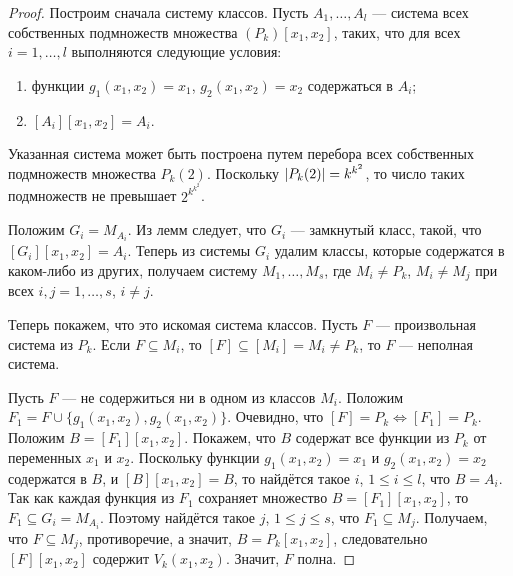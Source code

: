 \begin{proof}
    Построим сначала систему классов. Пусть $A_1, \ldots, A_l$ --- система всех собственных подмножеств множества $(P_k)[x_1, x_2]$, таких, что для всех $i = 1, \ldots, l$ выполняются следующие условия:
    \begin{enumerate}[nolistsep]
        \item функции $g_1(x_1, x_2) = x_1$, $g_2(x_1, x_2) = x_2$ содержаться в $A_i$;
        \item $[A_i][x_1, x_2] = A_i$.
    \end{enumerate}
    Указанная система может быть построена путем перебора всех собственных подмножеств множества $P_k(2)$. Поскольку $\left\lvert P_k(2)\right\rvert = k^{k^2}$, то число таких подмножеств не превышает $2^{k^{k^2}}$.

    Положим $G_i = M_{A_i}$. Из лемм следует, что $G_i$ --- замкнутый класс, такой, что $[G_i][x_1, x_2] = A_i$. Теперь из системы $G_i$ удалим классы, которые содержатся в каком-либо из других, получаем систему $M_1, \ldots, M_s$, где $M_i \neq P_k$, $M_i \neq M_j$ при всех $i,j = 1, \ldots, s$, $i\neq j$.

    Теперь покажем, что это искомая система классов. Пусть $F$ --- произвольная система из $P_k$. Если $F\subseteq M_i$, то $[F] \subseteq [M_i] = M_i \neq P_k$, то $F$ --- неполная система.

    Пусть $F$ --- не содержиться ни в одном из классов $M_i$. Положим
    $F_1 = F \cup \{g_1(x_1, x_2), g_2(x_1, x_2)\}$. Очевидно, что $[F] = P_k \Leftrightarrow [F_1] = P_k$. Положим $B=[F_1][x_1, x_2]$. Покажем, что $B$ содержат все функции из $P_k$ от переменных $x_1$ и $x_2$. Поскольку функции $g_1(x_1, x_2) = x_1$ и $g_2(x_1, x_2) = x_2$ содержатся в $B$, и $[B][x_1, x_2] = B$, то найдётся такое $i$, $1 \leqslant i \leqslant l$, что $B = A_i$. Так как каждая функция из $F_1$ сохраняет множество $B = [F_1][x_1, x_2]$, то $F_1 \subseteq G_i = M_{A_i}$. Поэтому найдётся такое $j$, $1 \leqslant j \leqslant s$, что $F_1 \subseteq M_j$. Получаем, что $F\subseteq M_j$, противоречие, а значит, $B = P_k[x_1, x_2]$, следовательно $[F][x_1, x_2]$ содержит $V_k(x_1, x_2)$. Значит, $F$ полна.
\end{proof}